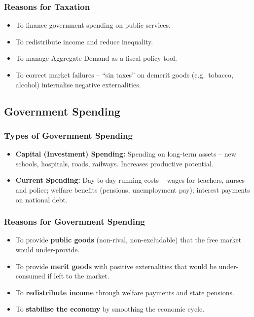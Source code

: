 \documentclass[11pt, a4paper, twoside]{book}
\begin{document}
\subsubsection{Reasons for Taxation}

\begin{itemize}
  \item To finance government spending on public services.
  \item To redistribute income and reduce inequality.
  \item To manage Aggregate Demand as a fiscal policy tool.
  \item To correct market failures -- ``sin taxes'' on demerit goods (e.g.\ tobacco, alcohol) internalise negative externalities.
\end{itemize}

\subsection{Government Spending}

\subsubsection{Types of Government Spending}

\begin{itemize}
  \item \textbf{Capital (Investment) Spending:} Spending on long-term assets -- new schools, hospitals, roads, railways. Increases productive potential.
  \item \textbf{Current Spending:} Day-to-day running costs -- wages for teachers, nurses and police; welfare benefits (pensions, unemployment pay); interest payments on national debt.
\end{itemize}

\subsubsection{Reasons for Government Spending}

\begin{itemize}
  \item To provide \textbf{public goods} (non-rival, non-excludable) that the free market would under-provide.
  \item To provide \textbf{merit goods} with positive externalities that would be under-consumed if left to the market.
  \item To \textbf{redistribute income} through welfare payments and state pensions.
  \item To \textbf{stabilise the economy} by smoothing the economic cycle.
\end{itemize}
\end{document}

